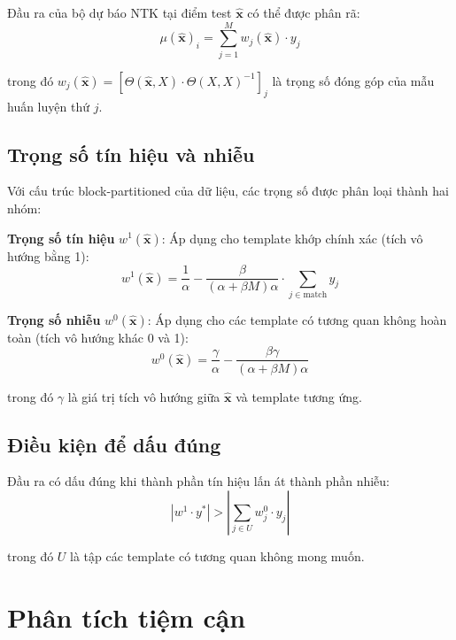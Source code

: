Đầu ra của bộ dự báo NTK tại điểm test $\hat{\mathbf{x}}$ có thể được phân rã:
\begin{equation}
    \mu(\hat{\mathbf{x}})_i = \sum_{j=1}^{M} w_j(\hat{\mathbf{x}}) \cdot y_j
\end{equation}

trong đó $w_j(\hat{\mathbf{x}}) = [\Theta(\hat{\mathbf{x}}, X) \cdot \Theta(X, X)^{-1}]_j$ là trọng số đóng góp của mẫu huấn luyện thứ $j$.

\subsection{Trọng số tín hiệu và nhiễu}

Với cấu trúc block-partitioned của dữ liệu, các trọng số được phân loại thành hai nhóm:

\textbf{Trọng số tín hiệu} $w^1(\hat{\mathbf{x}})$: Áp dụng cho template khớp chính xác (tích vô hướng bằng 1):
\begin{equation}
    w^1(\hat{\mathbf{x}}) = \frac{1}{\alpha} - \frac{\beta}{(\alpha + \beta M)\alpha} \cdot \sum_{j \in \text{match}} y_j
\end{equation}

\textbf{Trọng số nhiễu} $w^0(\hat{\mathbf{x}})$: Áp dụng cho các template có tương quan không hoàn toàn (tích vô hướng khác 0 và 1):
\begin{equation}
    w^0(\hat{\mathbf{x}}) = \frac{\gamma}{\alpha} - \frac{\beta \gamma}{(\alpha + \beta M)\alpha}
\end{equation}

trong đó $\gamma$ là giá trị tích vô hướng giữa $\hat{\mathbf{x}}$ và template tương ứng.

\subsection{Điều kiện để dấu đúng}

Đầu ra có dấu đúng khi thành phần tín hiệu lấn át thành phần nhiễu:
\begin{equation}
    |w^1 \cdot y^*| > \left|\sum_{j \in U} w^0_j \cdot y_j\right|
\end{equation}

trong đó $U$ là tập các template có tương quan không mong muốn.

\section{Phân tích tiệm cận}

